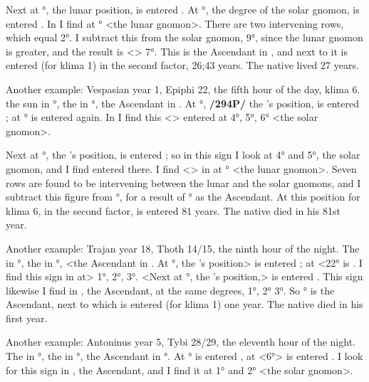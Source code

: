 Next at \Capricorn\xspace 17°, the lunar position, is entered \Taurus. At \Taurus\xspace 9°, the degree of the solar gnomon, is entered \Virgo. In \Pisces\xspace I find \Virgo\xspace at \Pisces\xspace 15° <the lunar gnomon>. There are two intervening rows, which equal 2°. I subtract this from the solar gnomon, 9°, since the lunar gnomon is greater, and the result is <\Pisces> 7°. This is the Ascendant in \Pisces, and next to it is entered (for klima 1) in the second factor, 26;43 years. The native lived 27 years.

Another example: Vespasian year 1, Epiphi 22, the fifth hour of the day, klima 6. the sun in \Cancer\xspace 28°, the \Moon\xspace in \Scorpio\xspace 3°, the Ascendant in \Libra. At \Cancer\xspace 28°, \textbf{/294P/} the \Sun’s position, is entered \Aquarius; at \Aquarius\xspace 28° is entered \Aquarius\xspace again. In \Libra\xspace I find this <\Aquarius> entered at 4°, 5°, 6°
<the solar gnomon>. 

Next at \Scorpio\xspace 3°, the \Moon’s position, is entered \Scorpio; so in this sign I look at 4° and 5°, the solar gnomon, and I find \Capricorn\xspace entered there. I find <\Capricorn> in \Libra\xspace at \Libra\xspace 22° <the lunar gnomon>. Seven rows are found to be intervening between the lunar and the solar
gnomons, and I subtract this figure from \Libra\xspace 4°, for a result of \Virgo\xspace 27° as the Ascendant. At this position for klima 6, in the second factor, is entered 81 years. The native died in his 81st year. 

Another example: Trajan year 18, Thoth 14/15, the ninth hour of the night. The \Sun\xspace in \Virgo\xspace 22°, the \Moon\xspace in \Aquarius\xspace 4°, <the Ascendant in \Leo. At \Virgo\xspace 22°, the \Sun’s position> is entered \Cancer; at \Cancer\xspace <22° is \Sagittarius. I find this sign in \Leo\xspace at> 1°, 2°, 3°. <Next at \Aquarius\xspace 4°, the \Moon’s position,> is entered \Sagittarius. This sign likewise I find in \Leo, the Ascendant, at the same degrees, 1°, 2° 3°. So \Leo\xspace 1° is the Ascendant, next to which is entered (for klima 1) one year. The native died in his first year.

Another example: Antoninus year 5, Tybi 28/29, the eleventh hour of the night. The \Sun\xspace in \Aquarius\xspace 6°, the \Moon\xspace in \Taurus\xspace 28°, the Ascendant in \Capricorn\xspace 6°. At \Aquarius\xspace 6° is entered \Virgo, at \Virgo\xspace 
<6°> is entered \Cancer. I look for this sign in \Capricorn, the Ascendant, and I find it at 1° and 2° <the solar gnomon>. 

